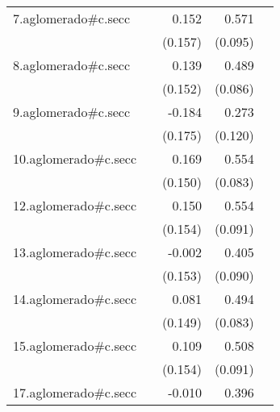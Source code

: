 {\begin{longtable}{l*{4}{D{.}{.}{-1}}}
\addlinespace
7.aglomerado#c.secc&                     &       0.152         &       0.571\sym{***}&                     \\
            &                     &     (0.157)         &     (0.095)         &                     \\
\addlinespace
8.aglomerado#c.secc&                     &       0.139         &       0.489\sym{***}&                     \\
            &                     &     (0.152)         &     (0.086)         &                     \\
\addlinespace
9.aglomerado#c.secc&                     &      -0.184         &       0.273\sym{*}  &                     \\
            &                     &     (0.175)         &     (0.120)         &                     \\
\addlinespace
10.aglomerado#c.secc&                     &       0.169         &       0.554\sym{***}&                     \\
            &                     &     (0.150)         &     (0.083)         &                     \\
\addlinespace
12.aglomerado#c.secc&                     &       0.150         &       0.554\sym{***}&                     \\
            &                     &     (0.154)         &     (0.091)         &                     \\
\addlinespace
13.aglomerado#c.secc&                     &      -0.002         &       0.405\sym{***}&                     \\
            &                     &     (0.153)         &     (0.090)         &                     \\
\addlinespace
14.aglomerado#c.secc&                     &       0.081         &       0.494\sym{***}&                     \\
            &                     &     (0.149)         &     (0.083)         &                     \\
\addlinespace
15.aglomerado#c.secc&                     &       0.109         &       0.508\sym{***}&                     \\
            &                     &     (0.154)         &     (0.091)         &                     \\
\addlinespace
17.aglomerado#c.secc&                     &      -0.010         &       0.396\sym{***}&                     \\

\end{longtable}}
